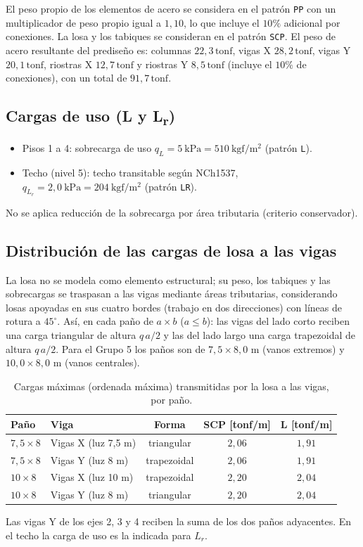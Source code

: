 \documentclass[11pt,letterpaper]{article}
\newcommand{\tonf}{\,\mathrm{tonf}}
\begin{document}
El peso propio de los elementos de acero se considera en el patrón \texttt{PP} con un multiplicador de
peso propio igual a $1{,}10$, lo que incluye el $10\%$ adicional por conexiones. La losa y los tabiques
se consideran en el patrón \texttt{SCP}. El peso de acero resultante del prediseño es:
columnas $22{,}3\tonf$, vigas X $28{,}2\tonf$,
vigas Y $20{,}1\tonf$, riostras X $12{,}7\tonf$ y
riostras Y $8{,}5\tonf$ (incluye el $10\%$ de conexiones), con un total de
$91{,}7\tonf$.

\subsection{\texorpdfstring{Cargas de uso (L y L\textsubscript{r})}{Cargas de uso (L y Lr)}}
\begin{itemize}
  \item Pisos 1 a 4: sobrecarga de uso $q_L = 5\ \mathrm{kPa} = 510\ \mathrm{kgf/m^2}$
        (patrón \texttt{L}).
  \item Techo (nivel 5): techo transitable según NCh1537,
        $q_{L_r} = 2{,}0\ \mathrm{kPa} = 204\ \mathrm{kgf/m^2}$
        (patrón \texttt{LR}). %
\end{itemize}
No se aplica reducción de la sobrecarga por área tributaria (criterio conservador).

\subsection{Distribución de las cargas de losa a las vigas}
La losa no se modela como elemento estructural; su peso, los tabiques y las sobrecargas se traspasan a las
vigas mediante áreas tributarias, considerando losas apoyadas en sus cuatro bordes (trabajo en dos
direcciones) con líneas de rotura a $45^\circ$. Así, en cada paño de $a \times b$ ($a \le b$):
las vigas del lado corto reciben una carga triangular de altura $q\,a/2$ y las del lado largo
una carga trapezoidal de altura $q\,a/2$. Para el Grupo 5 los paños son de
$7{,}5 \times 8{,}0$ m (vanos extremos) y $10{,}0 \times 8{,}0$ m (vanos centrales).

\begin{table}[H]
\centering
\caption{Cargas máximas (ordenada máxima) transmitidas por la losa a las vigas, por paño.}
\begin{tabular}{llccc}
\toprule
Paño & Viga & Forma & SCP [tonf/m] & L [tonf/m] \\
\midrule
$7{,}5 \times 8$ & Vigas X (luz 7,5 m) & triangular & $2{,}06$ & $1{,}91$ \\
$7{,}5 \times 8$ & Vigas Y (luz 8 m) & trapezoidal & $2{,}06$ & $1{,}91$ \\
$10 \times 8$ & Vigas X (luz 10 m) & trapezoidal & $2{,}20$ & $2{,}04$ \\
$10 \times 8$ & Vigas Y (luz 8 m) & triangular & $2{,}20$ & $2{,}04$ \\
\bottomrule
\end{tabular}
\end{table}
Las vigas Y de los ejes 2, 3 y 4 reciben la suma de los dos paños adyacentes. En el techo la carga
de uso es la indicada para $L_r$.
\end{document}
